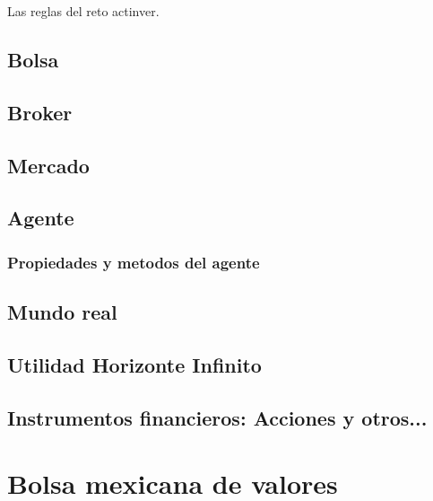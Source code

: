         Las reglas del reto actinver.
    
    \section{ Bolsa } %
      
        \blindtext
        
   	\section{ Broker } %
     
    \section{ Mercado } 
    
        \blindtext
    
    \section{ Agente } %
        
        \subsection{ Propiedades y metodos del agente }

                \blindtext
   
   	
   	\section{ Mundo real } %
   	
   	\section{ Utilidad Horizonte Infinito }
    
    \section{ Instrumentos financieros: Acciones y otros... }
    
\chapter{ Bolsa mexicana de valores }

